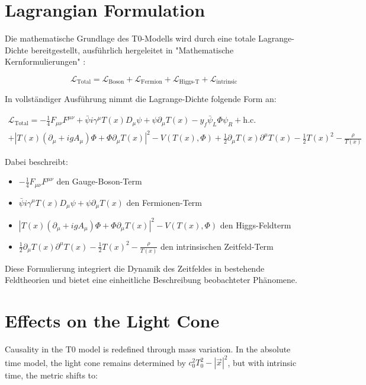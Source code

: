 \documentclass[a4paper,12pt]{article}
\newcommand{\Tfield}{T(x)}
\newcommand{\DcovT}[1]{\Tfield D_\mu #1 + #1 \partial_\mu \Tfield}
\newcommand{\DhiggsT}{\Tfield (\partial_\mu + ig A_\mu) \Phi + \Phi \partial_\mu \Tfield}
\begin{document}
\section{Lagrangian Formulation}

Die mathematische Grundlage des T0-Modells wird durch eine totale Lagrange-Dichte bereitgestellt, ausführlich hergeleitet in "Mathematische Kernformulierungen" \cite{pascher_lagrange_2025}:

\begin{equation}
	\mathcal{L}_{\text{Total}} = \mathcal{L}_{\text{Boson}} + \mathcal{L}_{\text{Fermion}} + \mathcal{L}_{\text{Higgs-T}} + \mathcal{L}_{\text{intrinsic}}
\end{equation}

In vollständiger Ausführung nimmt die Lagrange-Dichte folgende Form an:

\begin{multline}
	\mathcal{L}_{\text{Total}} = -\frac{1}{4} F_{\mu\nu} F^{\mu\nu} + \bar{\psi} i \gamma^\mu \DcovT{\psi} - y_f \bar{\psi}_L \Phi \psi_R + \text{h.c.} \\
	+ |\DhiggsT|^2 - V(\Tfield, \Phi) + \frac{1}{2} \partial_\mu \Tfield \partial^\mu \Tfield - \frac{1}{2}\Tfield^2 - \frac{\rho}{\Tfield}
\end{multline}

Dabei beschreibt:
\begin{itemize}
	\item $-\frac{1}{4} F_{\mu\nu} F^{\mu\nu}$ den Gauge-Boson-Term
	\item $\bar{\psi} i \gamma^\mu \DcovT{\psi}$ den Fermionen-Term
	\item $|\DhiggsT|^2 - V(\Tfield, \Phi)$ den Higgs-Feldterm
	\item $\frac{1}{2} \partial_\mu \Tfield \partial^\mu \Tfield - \frac{1}{2}\Tfield^2 - \frac{\rho}{\Tfield}$ den intrinsischen Zeitfeld-Term
\end{itemize}

Diese Formulierung integriert die Dynamik des Zeitfeldes in bestehende Feldtheorien und bietet eine einheitliche Beschreibung beobachteter Phänomene.
	
	\section{Effects on the Light Cone}
	
	Causality in the T0 model is redefined through mass variation. In the absolute time model, the light cone remains determined by \(c_0^2 T_0^2 - |\vec{x}|^2\), but with intrinsic time, the metric shifts to:
	
\end{document}
